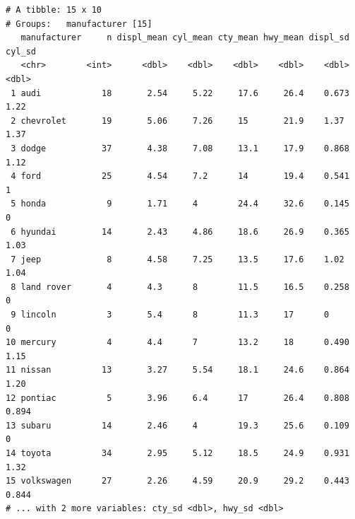 \documentclass[
  11pt,
]{krantz}
\begin{document}
\begin{verbatim}
# A tibble: 15 x 10
# Groups:   manufacturer [15]
   manufacturer     n displ_mean cyl_mean cty_mean hwy_mean displ_sd cyl_sd
   <chr>        <int>      <dbl>    <dbl>    <dbl>    <dbl>    <dbl>  <dbl>
 1 audi            18       2.54     5.22     17.6     26.4    0.673  1.22 
 2 chevrolet       19       5.06     7.26     15       21.9    1.37   1.37 
 3 dodge           37       4.38     7.08     13.1     17.9    0.868  1.12 
 4 ford            25       4.54     7.2      14       19.4    0.541  1    
 5 honda            9       1.71     4        24.4     32.6    0.145  0    
 6 hyundai         14       2.43     4.86     18.6     26.9    0.365  1.03 
 7 jeep             8       4.58     7.25     13.5     17.6    1.02   1.04 
 8 land rover       4       4.3      8        11.5     16.5    0.258  0    
 9 lincoln          3       5.4      8        11.3     17      0      0    
10 mercury          4       4.4      7        13.2     18      0.490  1.15 
11 nissan          13       3.27     5.54     18.1     24.6    0.864  1.20 
12 pontiac          5       3.96     6.4      17       26.4    0.808  0.894
13 subaru          14       2.46     4        19.3     25.6    0.109  0    
14 toyota          34       2.95     5.12     18.5     24.9    0.931  1.32 
15 volkswagen      27       2.26     4.59     20.9     29.2    0.443  0.844
# ... with 2 more variables: cty_sd <dbl>, hwy_sd <dbl>
\end{verbatim}
\end{document}
